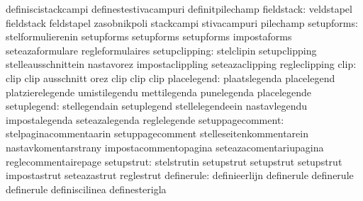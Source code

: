                                   definiscistackcampi              definestestivacampuri
                                  definitpilechamp
                      fieldstack: veldstapel                       fieldstack
                                  feldstapel                       zasobnikpoli
                                  stackcampi                       stivacampuri
                                  pilechamp
                      setupforms: stelformulierenin                setupforms
                                  setupforms                       setupforms
                                  impostaforms                     seteazaformulare
                                  regleformulaires
                   setupclipping: stelclipin                       setupclipping
                                  stelleausschnittein              nastavorez
                                  impostaclippling                 seteazaclipping
                                  regleclipping
                            clip: clip                             clip
                                  ausschnitt                       orez
                                  clip                             clip
                                  clip
                     placelegend: plaatslegenda                    placelegend
                                  platzierelegende                 umistilegendu
                                  mettilegenda                     punelegenda
                                  placelegende
                     setuplegend: stellegendain                    setuplegend
                                  stellelegendeein                 nastavlegendu
                                  impostalegenda                   seteazalegenda
                                  reglelegende
                setuppagecomment: stelpaginacommentaarin           setuppagecomment
                                  stelleseitenkommentarein         nastavkomentarstrany
                                  impostacommentopagina            seteazacomentariupagina
                                  reglecommentairepage
                      setupstrut: stelstrutin                      setupstrut
                                  setupstrut                       setupstrut
                                  impostastrut                     seteazastrut
                                  reglestrut
                      definerule: definieerlijn                    definerule
                                  definerule                       definerule
                                  definiscilinea                   definesterigla
